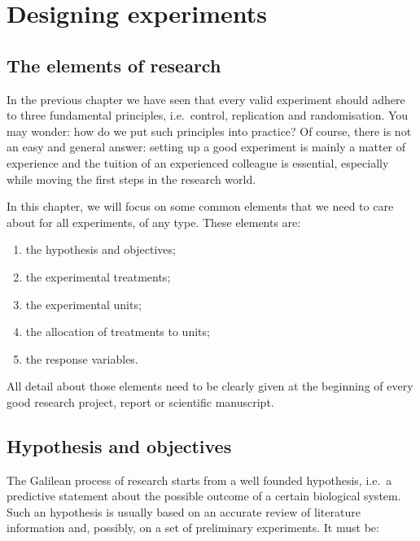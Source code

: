 \documentclass[a4paper,12pt,oneside]{book}
\providecommand{\tightlist}{%
  \setlength{\itemsep}{0pt}\setlength{\parskip}{0pt}}
\begin{document}
\hypertarget{designing-experiments}{%
\chapter{Designing experiments}\label{designing-experiments}}

\hypertarget{the-elements-of-research}{%
\section{The elements of research}\label{the-elements-of-research}}

In the previous chapter we have seen that every valid experiment should adhere to three fundamental principles, i.e.~control, replication and randomisation. You may wonder: how do we put such principles into practice? Of course, there is not an easy and general answer: setting up a good experiment is mainly a matter of experience and the tuition of an experienced colleague is essential, especially while moving the first steps in the research world.

In this chapter, we will focus on some common elements that we need to care about for all experiments, of any type. These elements are:

\begin{enumerate}
\def\labelenumi{\arabic{enumi}.}
\tightlist
\item
  the hypothesis and objectives;
\item
  the experimental treatments;
\item
  the experimental units;
\item
  the allocation of treatments to units;
\item
  the response variables.
\end{enumerate}

All detail about those elements need to be clearly given at the beginning of every good research project, report or scientific manuscript.

\hypertarget{hypothesis-and-objectives}{%
\section{Hypothesis and objectives}\label{hypothesis-and-objectives}}

The Galilean process of research starts from a well founded hypothesis, i.e.~a predictive statement about the possible outcome of a certain biological system. Such an hypothesis is usually based on an accurate review of literature information and, possibly, on a set of preliminary experiments. It must be:
\end{document}
